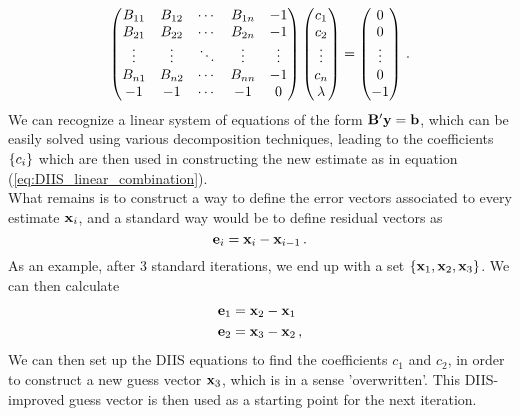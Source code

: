         \begin{equation}
            \begin{pmatrix}
                B_{11}  & B_{12}    & \cdots    & B_{1n}    & -1      \\
                B_{21}  & B_{22}    & \cdots    & B_{2n}    & -1      \\
                \vdots  & \vdots    & \ddots    & \vdots    & \vdots  \\
                B_{n1}  & B_{n2}    & \cdots    & B_{nn}    & -1      \\
                -1      & -1        & \cdots    &  -1       & 0
            \end{pmatrix}
            \begin{pmatrix}
                c_1     \\
                c_2     \\
                \vdots  \\
                c_n     \\
                \lambda
            \end{pmatrix}
            =
            \begin{pmatrix}
                0       \\
                0       \\
                \vdots  \\
                0       \\
                -1
            \end{pmatrix} \thinspace .
        \end{equation}
        We can recognize a linear system of equations of the form $\vb{B}' \vb{y} = \vb{b}$, which can be easily solved using various decomposition techniques, leading to the coefficients $\qty{c_i}$ which are then used in constructing the new estimate as in equation (\ref{eq:DIIS_linear_combination}). \\

        What remains is to construct a way to define the error vectors associated to every estimate $\vb{x}_i$, and a standard way would be to define residual vectors as
        \begin{equation}
            \vb{e}_i = \vb{x}_i - \vb{x}_{i-1} \thinspace .
        \end{equation}
        As an example, after 3 standard iterations, we end up with a set $\qty{\vb{x}_1, \vb{x}_2, \vb{x}_3}$. We can then calculate
        \begin{align}
            &\vb{e}_1 = \vb{x}_2 - \vb{x}_1 \\
            &\vb{e}_2 = \vb{x}_3 - \vb{x}_2 \thinspace ,
        \end{align}
        We can then set up the DIIS equations to find the coefficients $c_1$ and $c_2$, in order to construct a new guess vector $\vb{x}_3$, which is in a sense 'overwritten'. This DIIS-improved guess vector is then used as a starting point for the next iteration.
